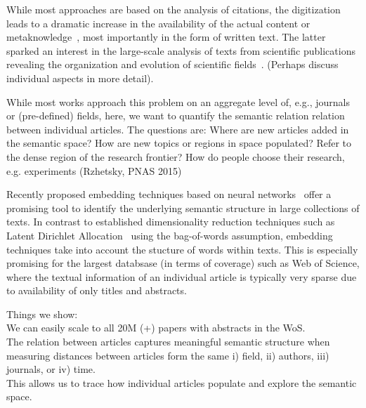 \documentclass[aps,pre,twocolumn,superscriptaddress]{revtex4-1}
\begin{document}
While most approaches are based on the analysis of citations, the  digitization leads to a dramatic increase in the availability of the actual content or metaknowledge~\cite{Evans2011}, most importantly in the form of written text.
The latter sparked an interest in the large-scale analysis of texts from scientific publications revealing the organization and evolution of scientific fields~\cite{Boyack2011,Chavalarias2013,Kuhn2014,Vilhena2014,Dias2017}. (Perhaps discuss individual aspects in more detail).

While most works approach this problem on an aggregate level of, e.g., journals or (pre-defined) fields, here, we want to quantify the semantic relation relation between individual articles.
The questions are:
Where are new articles added in the semantic space? 
How are new topics or regions in space populated?
Refer to the dense region of the research frontier?
How do people choose their research, e.g. experiments (Rzhetsky, PNAS 2015)


Recently proposed embedding techniques based on neural networks~\cite{Goldberg2016} offer a promising tool to identify the underlying semantic structure in large collections of texts.
In contrast to established dimensionality reduction techniques such as Latent Dirichlet Allocation~\cite{Blei2003} using the bag-of-words assumption, embedding techniques take into account the stucture of words within texts.
This is especially promising for the largest databsase (in terms of coverage) such as Web of Science, where the textual information of an individual article is typically very sparse due to availability of only titles and abstracts.


Things we show:\\
We can easily scale to all 20M (+) papers with abstracts in the WoS.\\
The relation between articles captures meaningful semantic structure when measuring distances between articles form the same i) field, ii) authors, iii) journals, or iv) time.\\
This allows us to trace how individual articles populate and explore the semantic space.
\end{document}
